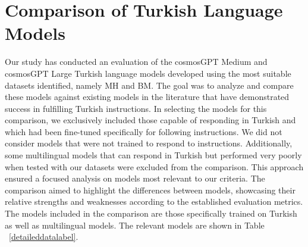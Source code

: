 \documentclass[conference]{IEEEtran}
\begin{document}
\section{Comparison of Turkish Language Models}

Our study has conducted an evaluation of the cosmosGPT Medium and cosmosGPT Large Turkish language models developed using the most suitable datasets identified, namely MH and BM. The goal was to analyze and compare these models against existing models in the literature that have demonstrated success in fulfilling Turkish instructions. In selecting the models for this comparison, we exclusively included those capable of responding in Turkish and which had been fine-tuned specifically for following instructions. We did not consider models that were not trained to respond to instructions. Additionally, some multilingual models that can respond in Turkish but performed very poorly when tested with our datasets were excluded from the comparison. This approach ensured a focused analysis on models most relevant to our criteria. The comparison aimed to highlight the differences between models, showcasing their relative strengths and weaknesses according to the established evaluation metrics. The models included in the comparison are those specifically trained on Turkish as well as multilingual models. The relevant models are shown in Table ~\ref{detaileddatalabel}.


\end{document}
